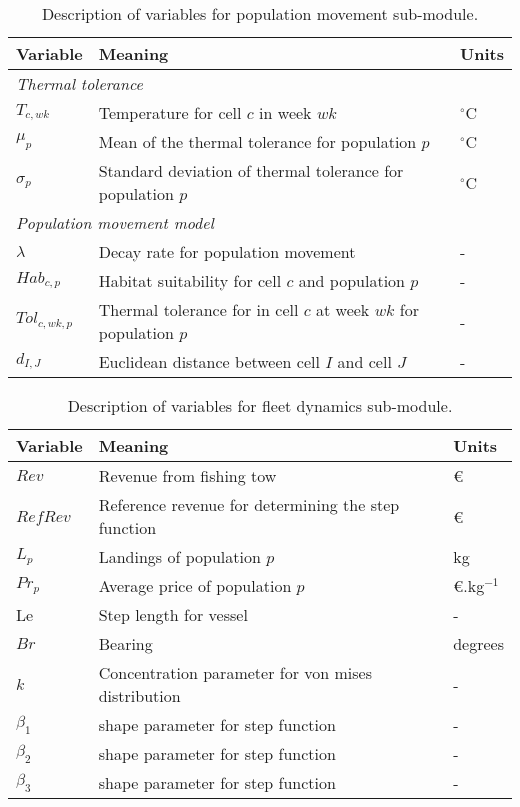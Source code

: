 \begin{table}[!ht]
	\centering
	\caption{Description of variables for population movement sub-module.}
	\label{tab:pop_move}
	\begin{tabular}{p{1.5cm} p{8cm} p{1.5cm}}
		\toprule
		Variable & Meaning & Units \\
		\hline
		\multicolumn{3}{l}{\textit{Thermal tolerance}} \\
		\hline
		$T_{c,wk}$ & Temperature for cell $c$ in week $wk$ & $^\circ$C \\
		$\mu_{p}$ & Mean of the thermal tolerance for population $p$ & $^\circ$C \\
		$\sigma_{p}$ & Standard deviation of thermal tolerance for
		population $p$ & $^\circ$C \\
		\hline
		\multicolumn{3}{l}{\textit{Population movement model}} \\
		\hline
		$\lambda$ & Decay rate for population movement & - \\
		$Hab_{c,p}$ & Habitat suitability for cell $c$ and
		population $p$ & - \\
		$Tol_{c,wk,p}$ & Thermal tolerance for in cell $c$ at week $wk$
		for population $p$ & - \\
		$d_{I,J}$ & Euclidean distance between cell $I$ and cell $J$ & - \\
		\bottomrule
		\end{tabular}
	\end{table}

\begin{table}[!ht]
	\centering
	\caption{Description of variables for fleet dynamics sub-module.}
	\label{tab:fleet_dyn}
	\begin{tabular}{p{1.5cm} p{8cm} p{1.5cm}}
		\toprule
		Variable & Meaning & Units \\
		\hline
		$Rev$ & Revenue from fishing tow & \euro \\
		$RefRev$ & Reference revenue for determining the step function
		& \euro \\
		$L_{p}$ & Landings of population $p$ & kg \\
		$Pr_{p}$ & Average price of population $p$ & \euro.kg$^{-1}$ \\
		Le & Step length for vessel & - \\
		$Br$ & Bearing & degrees \\
		$k$ & Concentration parameter for von mises distribution & - \\
		$\beta_{1}$ & shape parameter for step function & - \\
		$\beta_{2}$ & shape parameter for step function & - \\
		$\beta_{3}$ & shape parameter for step function & - \\
		\bottomrule
	\end{tabular}
\end{table}


